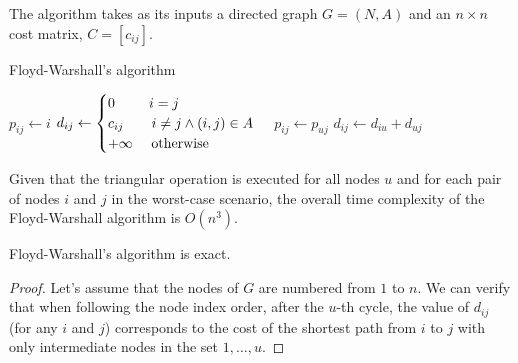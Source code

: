 \documentclass[12pt, a4paper]{report}
\begin{document}
    The algorithm takes as its inputs a directed graph $G = (N,A)$ and an $n \times n$ cost matrix, $C = [c_{ij}]$.
    \begin{algorithm}[H]
        \caption{Floyd-Warshall's algorithm}
            \begin{algorithmic}[1]
                        \State $p_{ij} \leftarrow i$
                        \State $d_{ij} \leftarrow \begin{cases}
                            0 \:\:\:\:\:\:\:\:\:\:\: i = j \\
                            c_{ij} \:\:\:\:\:\:\:\:\: i \neq j \land (i,j) \in A \\
                            +\infty \:\:\:\:\:\: \textnormal{otherwise}
                        \end{cases}$
                    \EndFor
                \EndFor
                                \State $p_{ij} \leftarrow p_{uj}$
                                \State $d_{ij} \leftarrow d_{iu}+d_{uj}$
                            \EndIf
                        \EndFor
                    \EndFor
                            \State \Return
                        \EndIf
                    \EndFor
                \EndFor
            \end{algorithmic}
    \end{algorithm}
    Given that the triangular operation is executed for all nodes $u$ and for each pair of nodes $i$ and $j$ in the worst-case scenario, the overall time complexity of the Floyd-Warshall algorithm is $O(n^3)$.
    \begin{proposition}
        Floyd-Warshall's algorithm is exact. 
    \end{proposition}
    \begin{proof}
        Let's assume that the nodes of $G$ are numbered from $1$ to $n$. 
        We can verify that when following the node index order, after the $u$-th cycle, the value of $d_{ij}$ (for any $i$ and $j$) corresponds to the cost of the shortest path from $i$ to $j$ with only intermediate nodes in the set ${1,\dots,u}$. 
    \end{proof}
\end{document}
